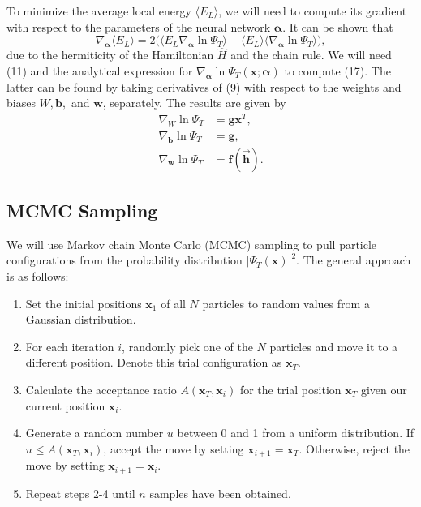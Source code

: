 \documentclass[prb,aps,twocolumn,showpacs,10pt]{revtex4-1}
\begin{document}
To minimize the average local energy $\langle E_L \rangle$, we will need to compute its gradient with respect to the parameters of the neural network $\bm{\alpha}$. It can be shown that
\begin{equation}
\nabla_{\bm{\alpha}} \langle E_L \rangle =  2 \Big( \big\langle E_L \nabla_{\bm{\alpha}} \ln \Psi_{T}\big\rangle - \langle E_L \rangle \big\langle  \nabla_{\bm{\alpha}} \ln \Psi_{T} \big\rangle \Big),
\end{equation}
due to the hermiticity of the Hamiltonian $\hat{H}$ and the chain rule. We will need (11) and the analytical expression for $\nabla_{\bm{\alpha}} \ln \Psi_{T} (\bm{x};\bm{\alpha})$ to compute (17). The latter can be found by taking derivatives of (9) with respect to the weights and biases $W, \bm{b},$ and $ \bm{w}$, separately. The results are given by
\begin{align}
\nabla_W \ln \Psi_T &= \bm{g} \bm{x}^T,\\
\nabla_{\bm{b}} \ln \Psi_T &= \bm{g},\\
\nabla_{\bm{w}} \ln \Psi_T &= \bm{f}(\vec{\bm{h}}).
\end{align}


\subsection{MCMC Sampling}

We will use Markov chain Monte Carlo (MCMC) sampling to pull particle configurations from the probability distribution $|\Psi_T(\bm{x})|^2$. The general approach is as follows:
\begin{enumerate}
\item Set the initial positions $\bm{x}_1$ of all $N$ particles to random values from a Gaussian distribution.
\item For each iteration $i$, randomly pick one of the $N$ particles and move it to a different position. Denote this trial configuration as $\bm{x}_T$.
\item Calculate the acceptance ratio $A(\bm{x}_T, \bm{x}_i)$ for the trial position $\bm{x}_T$ given our current position $\bm{x}_i$. 
\item Generate a random number $u$ between 0 and 1 from a uniform distribution. If $u \leq A(\bm{x}_T, \bm{x}_i)$, accept the move by setting $\bm{x}_{i+1}=\bm{x}_T$. Otherwise, reject the move by setting $\bm{x}_{i+1}=\bm{x}_i$. 
\item Repeat steps 2-4 until $n$ samples have been obtained. 
\end{enumerate}
\end{document}
